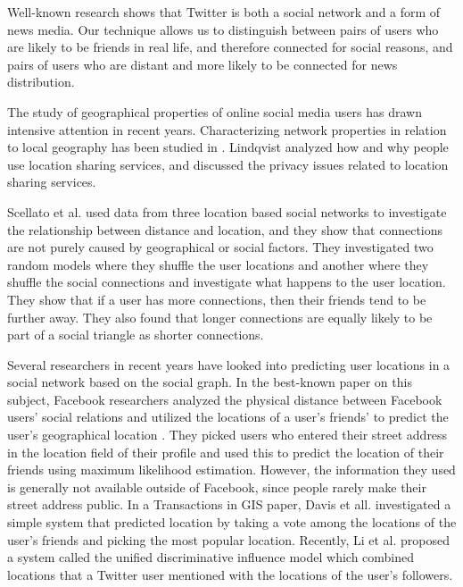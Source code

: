 Well-known research \cite{kwak2010why} shows that Twitter is both a social
network and a form of news media.
%
Our technique allows us to distinguish between pairs of users who are likely
to be friends in real life, and therefore connected for social reasons, and
pairs of users who are distant and more likely to be connected for news
distribution.



The study of geographical properties of online social media users has drawn
intensive attention in recent years.  Characterizing network properties in
relation to local geography has been studied in \cite{yardi2010tweeting}.
Lindqvist \cite{lindqvist2011m} analyzed how and why people use location
sharing services, and discussed the privacy issues related to location sharing
services.

Scellato et al. \cite{scellato2011socio} used data from three location based
social networks to investigate the relationship between distance and location,
and they show that connections are not purely caused by geographical or social
factors.  They investigated two random models where they shuffle the user
locations and another where they shuffle the social connections and investigate
what happens to the user location.  They show that if a user has more
connections, then their friends tend to be further away.  They also found that
longer connections are equally likely to be part of a social triangle as
shorter connections.

Several researchers in recent years have looked into predicting user locations
in a social network based on the social graph.
%
In the best-known paper on this subject, Facebook researchers analyzed
the physical distance between Facebook users' social relations and utilized the
locations of a user's friends' to predict the user's geographical location
\cite{backstrom2010find}.
%
They picked users who entered their street address in the location field of
their profile and used this to predict the location of their friends using
maximum likelihood estimation.
%
However, the information they used is generally not available outside of
Facebook, since people rarely make their street address public.
%
In a Transactions in GIS paper, Davis et all. \cite{davis2011infer}
investigated a simple system that predicted location by taking a vote among
the locations of the user's friends and picking the most popular location.
%
Recently, Li et al. \cite{li2012towards} proposed a system called the unified
discriminative influence model which combined locations that a Twitter user
mentioned with the locations of the user's followers.

